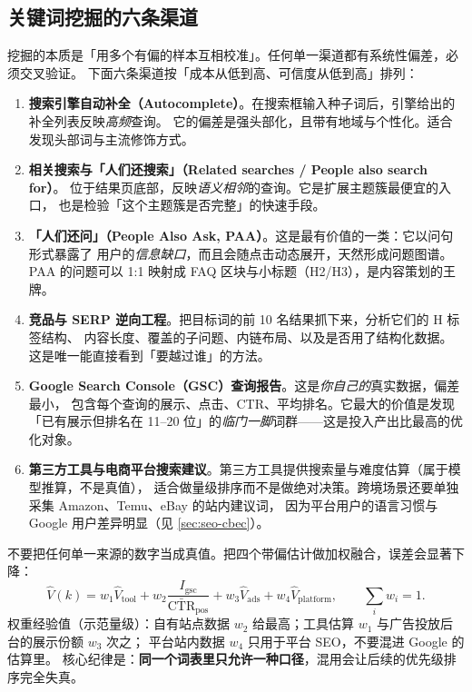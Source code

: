 \subsection{关键词挖掘的六条渠道}

挖掘的本质是「用多个有偏的样本互相校准」。任何单一渠道都有系统性偏差，必须交叉验证。
下面六条渠道按「成本从低到高、可信度从低到高」排列：

\begin{enumerate}
  \item \textbf{搜索引擎自动补全（Autocomplete）}。在搜索框输入种子词后，引擎给出的补全列表反映\emph{高频}查询。
        它的偏差是强头部化，且带有地域与个性化。适合发现头部词与主流修饰方式。
  \item \textbf{相关搜索与「人们还搜索」（Related searches / People also search for）}。
        位于结果页底部，反映\emph{语义相邻}的查询。它是扩展主题簇最便宜的入口，
        也是检验「这个主题簇是否完整」的快速手段。
  \item \textbf{「人们还问」（People Also Ask, PAA）}。这是最有价值的一类：它以问句形式暴露了
        用户的\emph{信息缺口}，而且会随点击动态展开，天然形成问题图谱。
        PAA 的问题可以 1:1 映射成 FAQ 区块与小标题（H2/H3），是内容策划的王牌。
  \item \textbf{竞品与 SERP 逆向工程}。把目标词的前 10 名结果抓下来，分析它们的 H 标签结构、
        内容长度、覆盖的子问题、内链布局、以及是否用了结构化数据。
        这是唯一能直接看到「要越过谁」的方法。
  \item \textbf{Google Search Console（GSC）查询报告}。这是\emph{你自己的}真实数据，偏差最小，
        包含每个查询的展示、点击、CTR、平均排名。它最大的价值是发现
        「已有展示但排名在 11--20 位」的\emph{临门一脚}词群——这是投入产出比最高的优化对象。
  \item \textbf{第三方工具与电商平台搜索建议}。第三方工具提供搜索量与难度估算（属于模型推算，不是真值），
        适合做量级排序而不是做绝对决策。跨境场景还要单独采集 Amazon、Temu、eBay 的站内建议词，
        因为平台用户的语言习惯与 Google 用户差异明显（见 \cref{sec:seo-cbec}）。
\end{enumerate}

\begin{formulacard}[搜索量的四源校准]
不要把任何单一来源的数字当成真值。把四个带偏估计做加权融合，误差会显著下降：
\begin{equation}
\hat{V}(k) = w_1 \hat{V}_{\text{tool}} + w_2 \frac{I_{\text{gsc}}}{\bar{\text{CTR}}_{\text{pos}}} + w_3 \hat{V}_{\text{ads}} + w_4 \hat{V}_{\text{platform}} ,
\qquad \sum_i w_i = 1 .
\label{eq:volume}
\end{equation}
权重经验值（示范量级）：自有站点数据 $w_2$ 给最高；工具估算 $w_1$ 与广告投放后台的展示份额 $w_3$ 次之；
平台站内数据 $w_4$ 只用于平台 SEO，不要混进 Google 的估算里。
核心纪律是：\textbf{同一个词表里只允许一种口径}，混用会让后续的优先级排序完全失真。
\end{formulacard}

